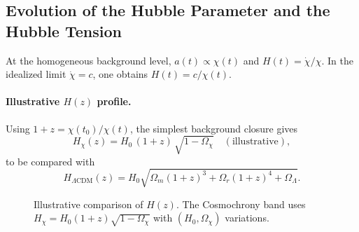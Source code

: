 \subsection{Evolution of the Hubble Parameter and the Hubble Tension}
  \label{app:hubble_tension}

  At the homogeneous background level, $a(t) \propto \chi(t)$ and
  $H(t) = \dot{\chi}/\chi$.
  In the idealized limit $\dot{\chi} = c$, one obtains
  $H(t) = c/\chi(t)$.

  \paragraph{Illustrative $H(z)$ profile.}
    Using $1+z = \chi(t_0)/\chi(t)$, the simplest background closure gives
    \begin{equation}
      H_{\chi}(z)
      = H_0\,(1+z)\,\sqrt{1-\Omega_{\chi}}
      \quad(\text{illustrative}),
      \label{eq:Hz_cosmochrony_illustrative}
    \end{equation}
    to be compared with
    \begin{equation}
      H_{\Lambda\mathrm{CDM}}(z)
      = H_0
      \sqrt{\Omega_m(1+z)^3
      + \Omega_r(1+z)^4
      + \Omega_\Lambda}.
      \label{eq:Hz_LCDM}
    \end{equation}

    \begin{figure}[t]
      \centering
      \caption{Illustrative comparison of $H(z)$.
      The Cosmochrony band uses
        $H_\chi = H_0(1+z)\sqrt{1-\Omega_\chi}$ with
        $(H_0,\Omega_\chi)$ variations.}
      \label{fig:Hz_comparison}
    \end{figure}

